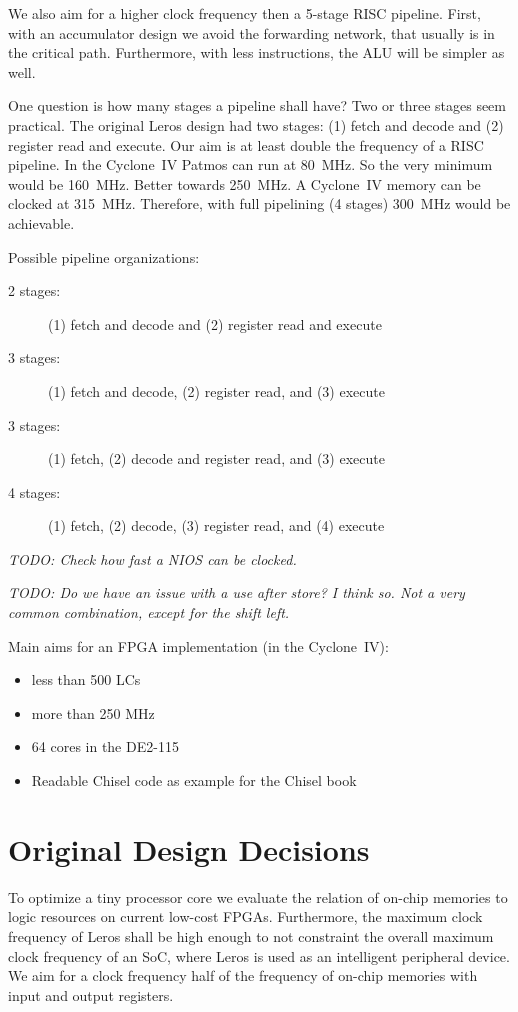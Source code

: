 \documentclass[a4paper,fontsize=10pt,twoside,DIV15,BCOR12mm,headinclude=true,footinclude=false,pagesize,bibtotoc]{scrbook}
\newcommand{\todo}[1]{{\emph{TODO: #1}}}
\begin{document}
We also aim for a higher clock frequency then a 5-stage RISC pipeline. First, with an
accumulator design we avoid the forwarding network, that usually is in the critical path.
Furthermore, with less instructions, the ALU will be simpler as well.

One question is how many stages a pipeline shall have? Two or three stages seem practical.
The original Leros design had two stages: (1) fetch and decode and (2) register read and execute.
Our aim is at least double the frequency of a RISC pipeline. In the Cyclone~IV
Patmos can run at 80~MHz. So the very minimum would be 160~MHz.
Better towards 250~MHz. A Cyclone~IV memory can be clocked at 315~MHz.
Therefore, with full pipelining (4 stages) 300~MHz would be achievable.

Possible pipeline organizations:

\begin{description}
\item[2 stages:] (1) fetch and decode and (2) register read and execute
\item[3 stages:] (1) fetch and decode, (2) register read, and (3) execute
\item[3 stages:] (1) fetch, (2) decode and register read, and (3) execute
\item[4 stages:] (1) fetch, (2) decode, (3) register read, and (4) execute
\end{description}
\todo{Check how fast a NIOS can be clocked.}

\todo{Do we have an issue with a use after store? I think so. Not a very common combination, except
for the shift left.}

Main aims for an FPGA implementation (in the Cyclone~IV):

\begin{itemize}
\item less than 500 LCs
\item more than 250 MHz
\item 64 cores in the DE2-115
\item Readable Chisel code as example for the Chisel book
\end{itemize}


\section{Original Design Decisions}

To optimize a tiny processor core we evaluate the relation of on-chip memories to logic resources on current low-cost FPGAs. Furthermore, the maximum clock frequency of Leros shall be high enough to not constraint the overall maximum clock frequency of an SoC, where Leros is used as an intelligent peripheral device. We aim for a clock frequency half of the frequency of on-chip memories with input and output registers.
\end{document}
